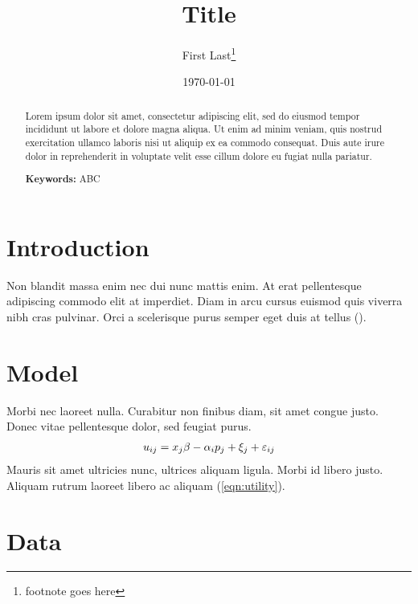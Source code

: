 \documentclass[11pt]{article}
\begin{document}
\begin{titlepage}
  \title{Title}
  \author{First Last\thanks{footnote goes here}}
  \date{\small \today}
  \maketitle
  
  \bigskip

  \begin{abstract}
    \noindent Lorem ipsum dolor sit amet, consectetur adipiscing elit, sed do eiusmod tempor incididunt ut labore et dolore magna aliqua. Ut enim ad minim veniam, quis nostrud exercitation ullamco laboris nisi ut aliquip ex ea commodo consequat. Duis aute irure dolor in reprehenderit in voluptate velit esse cillum dolore eu fugiat nulla pariatur. 

    \bigskip

    \noindent\textbf{Keywords:} ABC
  \end{abstract}

  \setcounter{page}{0}
  \thispagestyle{empty}
\end{titlepage}

\newpage

\section{Introduction} \label{sec:introduction}

Non blandit massa enim nec dui nunc mattis enim. At erat pellentesque adipiscing commodo elit at imperdiet. Diam in arcu cursus euismod quis viverra nibh cras pulvinar. Orci a scelerisque purus semper eget duis at tellus (\cite{koenker2001quantile}). 

\section{Model} \label{sec:model}

Morbi nec laoreet nulla. Curabitur non finibus diam, sit amet congue justo. Donec vitae pellentesque dolor, sed feugiat purus. 
\begin{align}
  u_{ij} = x_j \beta - \alpha_i p_j + \xi_j + \varepsilon_{ij} \label{eqn:utility}
\end{align}
Mauris sit amet ultricies nunc, ultrices aliquam ligula. Morbi id libero justo. Aliquam rutrum laoreet libero ac aliquam (\ref{eqn:utility}).

\section{Data} \label{sec:data}
\end{document}
